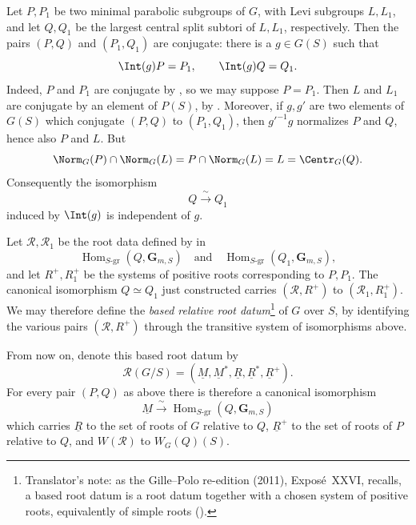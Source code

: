 
Let \(P,P_1\) be two minimal parabolic subgroups of \(G\), with
Levi subgroups \(L,L_1\), and let \(Q,Q_1\) be the largest central
split subtori of \(L,L_1\), respectively.  Then the pairs
\((P,Q)\) and \((P_1,Q_1)\) are conjugate: there is a \(g\in G(S)\)
such that
\[
 \Int(g)P=P_1,\qquad \Int(g)Q=Q_1.
\]
Indeed, \(P\) and \(P_1\) are conjugate by , so we may suppose
\(P=P_1\).  Then \(L\) and \(L_1\) are conjugate by an element of
\(P(S)\), by .  Moreover, if \(g,g'\) are two elements of \(G(S)\)
which conjugate \((P,Q)\) to \((P_1,Q_1)\), then \(g'^{-1}g\)
normalizes \(P\) and \(Q\), hence also \(P\) and \(L\).  But
\[
 \Norm_G(P)\cap\Norm_G(L)
 =P\cap\Norm_G(L)
 =L
 =\Centr_G(Q).
\]
Consequently the isomorphism
\[
 Q\xrightarrow{\ \sim\ }Q_1
\]
induced by \(\Int(g)\) is independent of \(g\).

Let \(\mathcal R,\mathcal R_1\) be the root data defined by  in
\[
 \operatorname{Hom}_{S\text{-}\mathrm{gr}}(Q,\mathbf G_{m,S})
 \quad\text{and}\quad
 \operatorname{Hom}_{S\text{-}\mathrm{gr}}(Q_1,\mathbf G_{m,S}),
\]
and let \(R^+,R_1^+\) be the systems of positive roots corresponding
to \(P,P_1\).  The canonical isomorphism \(Q\simeq Q_1\) just
constructed carries \((\mathcal R,R^+)\) to
\((\mathcal R_1,R_1^+)\).  We may therefore define the
\emph{based relative root datum}\footnote{Translator's note: as the Gille--Polo re-edition (2011), Exposé~XXVI,
recalls, a based root datum is a root datum together with a chosen system
of positive roots, equivalently of simple roots \textup{()}.} of \(G\) over \(S\), by identifying
the various pairs \((\mathcal R,R^+)\) through the transitive system
of isomorphisms above.

From now on, denote this based root datum by
\[
 \mathcal R(G/S)
 =(\underline M,\underline M^*,\underline R,
   \underline R^*,\underline R^+).
\]
For every pair \((P,Q)\) as above there is therefore a
canonical isomorphism
\[
 \underline M\xrightarrow{\ \sim\ }
 \operatorname{Hom}_{S\text{-}\mathrm{gr}}(Q,\mathbf G_{m,S})
\]
which carries \(\underline R\) to the set of roots of \(G\) relative
to \(Q\), \(\underline R^+\) to the set of roots of \(P\) relative to
\(Q\), and \(W(\mathcal R)\) to \(W_G(Q)(S)\).


